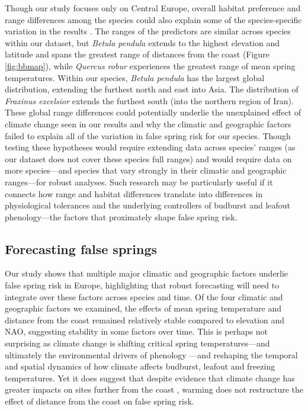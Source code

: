 \documentclass{article}\usepackage[]{graphicx}\usepackage[]{color}
\begin{document}
Though our study focuses only on Central Europe, overall habitat preference and range differences among the species could also explain some of the species-specific variation in the results \citep{Chuine2001}. The ranges of the predictors are similar across species within our dataset, but \textit{Betula pendula} extends to the highest elevation and latitude and spans the greatest range of distances from the coast (Figure \ref{fig:bbmap}), while \textit{Quercus robur} experiences the greatest range of mean spring temperatures. Within our species, \textit{Betula pendula} has the largest global distribution, extending the furthest north and east into Asia. The distribution of \textit{Fraxinus excelsior} extends the furthest south (into the northern region of Iran). These global range differences could potentially underlie the unexplained effect of climate change seen in our results and why the climatic and geographic factors failed to explain all of the variation in false spring risk for our species. Though testing these hypotheses would require extending data across species' ranges (as our dataset does not cover these species full ranges) and would require data on more species---and species that vary strongly in their climatic and geographic ranges---for robust analyses. Such research may be particularly useful if it connects how range and habitat differences translate into differences in physiological tolerances and the underlying controllers of budburst and leafout phenology---the factors that proximately shape false spring risk. 

\subsection*{Forecasting false springs}
Our study shows that multiple major climatic and geographic factors underlie false spring risk in Europe, highlighting that robust forecasting will need to integrate over these factors across species and time. Of the four climatic and geographic factors we examined, the effects of mean spring temperature and distance from the coast remained relatively stable compared to elevation and NAO, suggesting stability in some factors over time. This is perhaps not surprising as climate change is shifting critical spring temperatures---and ultimately the environmental drivers of phenology \citep{Gauzere2019}---and reshaping the temporal and spatial dynamics of how climate affects budburst, leafout and freezing temperatures.  Yet it does suggest that despite evidence that climate change has greater impacts on sites further from the coast \citep{Harrington2015}, warming does not restructure the effect of distance from the coast on false spring risk.
\end{document}
